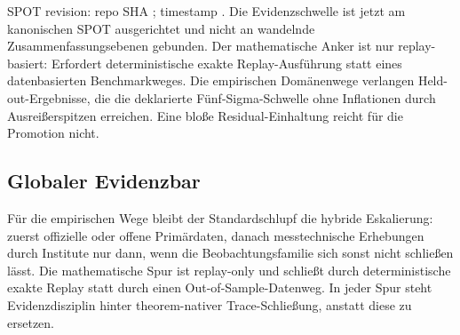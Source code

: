 SPOT revision: repo SHA ; timestamp .
Die Evidenzschwelle ist jetzt am kanonischen SPOT ausgerichtet und nicht an wandelnde Zusammenfassungsebenen gebunden. Der mathematische Anker ist nur replay-basiert: Erfordert deterministische exakte Replay-Ausführung statt eines datenbasierten Benchmarkweges. Die empirischen Domänenwege verlangen Held-out-Ergebnisse, die die deklarierte Fünf-Sigma-Schwelle ohne Inflationen durch Ausreißerspitzen erreichen. Eine bloße Residual-Einhaltung reicht für die Promotion nicht.

\subsection{Globaler Evidenzbar}
Für die empirischen Wege bleibt der Standardschlupf die hybride Eskalierung: zuerst offizielle oder offene Primärdaten, danach messtechnische Erhebungen durch Institute nur dann, wenn die Beobachtungsfamilie sich sonst nicht schließen lässt. Die mathematische Spur ist replay-only und schließt durch deterministische exakte Replay statt durch einen Out-of-Sample-Datenweg. In jeder Spur steht Evidenzdisziplin hinter theorem-nativer Trace-Schließung, anstatt diese zu ersetzen.

